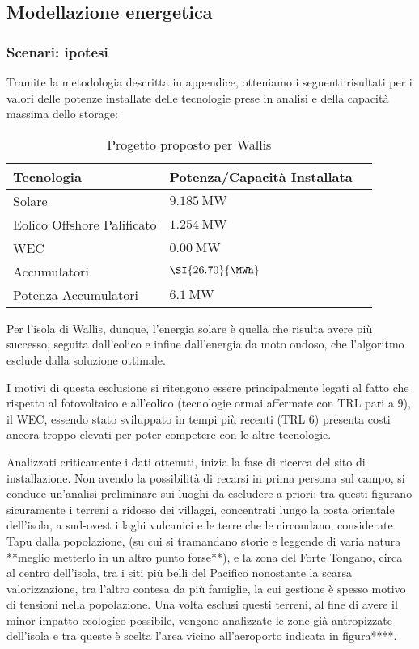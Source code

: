 \subsection{Modellazione energetica}

\subsubsection{Scenari: ipotesi}
Tramite la metodologia descritta in appendice, otteniamo i seguenti risultati per i valori delle potenze installate delle tecnologie prese in analisi e della capacità massima dello storage:
\begin{table}[H]
	\caption{Progetto proposto per Wallis}
	\centering
	\begin{tabular}{llc}
		\toprule
		Tecnologia   & Potenza/Capacità Installata \\
		\midrule
		Solare       & \(\SI{9.185}{\MW}\)         \\
		Eolico Offshore Palificato & \(\SI{1.254}{\MW}\) \\
		WEC          & \(\SI{0.00}{\MW}\)         \\
		Accumulatori & \(\SI{26.70}{\MWh}\)        \\
		Potenza Accumulatori & \(\SI{6.1}{\MW}\)   \\
		\bottomrule
	\end{tabular}
	\label{tab:wallis_project}
\end{table}

Per l'isola di Wallis, dunque, l'energia solare è quella che risulta avere più successo, seguita dall'eolico e infine dall'energia da moto ondoso, che l'algoritmo esclude dalla soluzione ottimale.

I motivi di questa esclusione si ritengono essere principalmente legati al fatto che rispetto al fotovoltaico e all'eolico (tecnologie ormai affermate con TRL pari a 9), il WEC, essendo stato sviluppato in tempi più recenti (TRL 6) presenta costi ancora troppo elevati per poter competere con le altre tecnologie.

Analizzati criticamente i dati ottenuti, inizia la fase di ricerca del sito di installazione. 
Non avendo la possibilità di recarsi in prima persona sul campo, si conduce un'analisi preliminare sui luoghi da escludere a priori: tra questi figurano sicuramente i terreni a ridosso dei villaggi, concentrati lungo la costa orientale dell'isola, a sud-ovest i laghi vulcanici e le terre che le circondano, considerate Tapu dalla popolazione, (su cui si tramandano storie e leggende di varia natura **meglio metterlo in un altro punto forse**), e la zona del Forte Tongano, circa al centro dell'isola, tra i siti più belli del Pacifico nonostante la scarsa valorizzazione, tra l'altro contesa da più famiglie, la cui gestione è spesso motivo di tensioni nella popolazione.
Una volta esclusi questi terreni, al fine di avere il minor impatto ecologico possibile, vengono analizzate le zone già antropizzate dell'isola e tra queste è scelta l'area vicino all'aeroporto indicata in figura****. 

